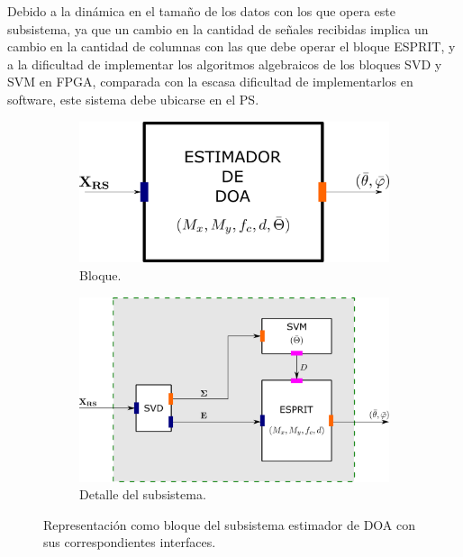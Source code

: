 Debido a la dinámica en el tamaño de los datos con los que opera este subsistema, ya que un cambio en la cantidad de señales recibidas implica un cambio en la cantidad de columnas con las que debe operar el bloque ESPRIT, y a la dificultad de implementar los algoritmos algebraicos de los bloques SVD y SVM en FPGA, comparada con la escasa dificultad de implementarlos en software, este sistema debe ubicarse en el PS.
\begin{figure}[ht!]
    \centering
    \begin{subfigure}[b]{0.5\textwidth}
        \centering
        \includegraphics[width=\linewidth]{images/06-Sistema/sistema_doaest.png}
        \caption{Bloque.}
        \label{fig:sistema_doaest}
    \end{subfigure}
    \hfill
    \begin{subfigure}[b]{0.9\textwidth}
        \centering
        \includegraphics[width=\linewidth]{images/06-Sistema/sistema_doaest_2.png}
        \caption{Detalle del subsistema.}
        \label{fig:sistema_doaest_2}
    \end{subfigure}
    \caption{Representación como bloque del subsistema estimador de DOA con sus correspondientes interfaces.}
\end{figure}



